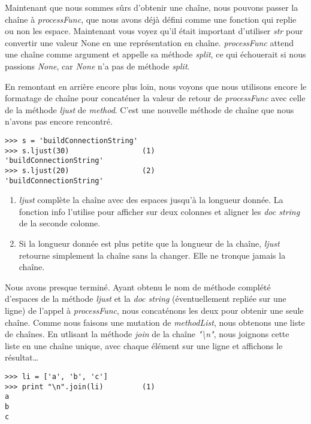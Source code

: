 Maintenant que nous sommes sûrs d’obtenir une chaîne, nous pouvons passer la chaîne à \emph{processFunc}, que nous avons déjà défini comme une fonction qui replie ou non les espace. Maintenant vous voyez qu’il était important d’utiliser \emph{str} pour convertir une valeur None en une représentation en chaîne. \emph{processFunc} attend une chaîne comme argument et appelle sa méthode \emph{split}, ce qui échouerait si nous passions \emph{None}, car \emph{None} n’a pas de méthode \emph{split}.

En remontant en arrière encore plus loin, nous voyons que nous utilisons encore le formatage de chaîne pour concaténer la valeur de retour de \emph{processFunc} avec celle de la méthode \emph{ljust} de \emph{method}. C’est une nouvelle méthode de chaîne que nous n’avons pas encore rencontré.

\begin{example}
\begin{lstlisting}
>>> s = 'buildConnectionString'
>>> s.ljust(30)                 (1)
'buildConnectionString'
>>> s.ljust(20)                 (2)
'buildConnectionString'
\end{lstlisting}
\end{example}

\begin{enumerate}
    \item \emph{ljust} complète la chaîne avec des espaces jusqu’à la longueur donnée. La fonction info l’utilise pour afficher sur deux colonnes et aligner les \emph{doc string} de la seconde colonne.
    \item Si la longueur donnée est plus petite que la longueur de la chaîne, \emph{ljust} retourne simplement la chaîne sans la changer. Elle ne tronque jamais la chaîne.
\end{enumerate}

Nous avons presque terminé. Ayant obtenu le nom de méthode complété d’espaces de la méthode \emph{ljust} et la \emph{doc string} (éventuellement repliée sur une ligne) de
l’appel à \emph{processFunc}, nous concaténons les deux pour obtenir une seule chaîne. Comme nous faisons une mutation de \emph{methodList}, nous obtenons une liste de
chaînes. En utlisant la méthode \emph{join} de la chaîne \emph{"\textbackslash n"}, nous joignons cette liste en une chaîne unique, avec chaque élément sur une ligne et affichons le résultat…

\begin{example}
\begin{lstlisting}
>>> li = ['a', 'b', 'c']
>>> print "\n".join(li)         (1)
a
b
c
\end{lstlisting}
\end{example}

